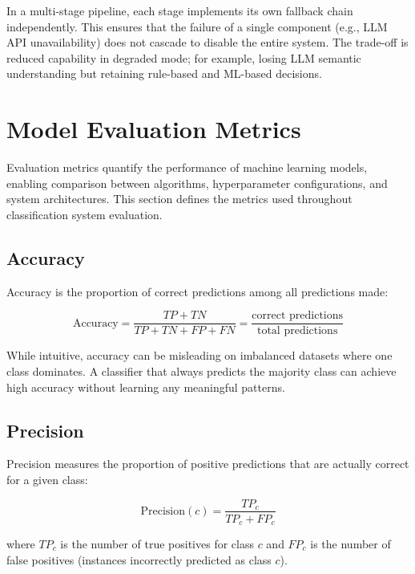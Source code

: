 \documentclass[10pt,a4paper]{article}
\begin{document}
In a multi-stage pipeline, each stage implements its own fallback chain independently. This ensures that the failure of a single component (e.g., LLM API unavailability) does not cascade to disable the entire system. The trade-off is reduced capability in degraded mode; for example, losing LLM semantic understanding but retaining rule-based and ML-based decisions.

\section{Model Evaluation Metrics}
\label{sec:evaluation-metrics}

Evaluation metrics quantify the performance of machine learning models, enabling comparison between algorithms, hyperparameter configurations, and system architectures. This section defines the metrics used throughout classification system evaluation.

\subsection{Accuracy}
\label{sec:accuracy}

Accuracy is the proportion of correct predictions among all predictions made:

\begin{equation}
\text{Accuracy} = \frac{TP + TN}{TP + TN + FP + FN} = \frac{\text{correct predictions}}{\text{total predictions}}
\label{eq:accuracy}
\end{equation}

While intuitive, accuracy can be misleading on imbalanced datasets where one class dominates. A classifier that always predicts the majority class can achieve high accuracy without learning any meaningful patterns.

\subsection{Precision}
\label{sec:precision}

Precision measures the proportion of positive predictions that are actually correct for a given class:

\begin{equation}
\text{Precision}(c) = \frac{TP_c}{TP_c + FP_c}
\label{eq:precision}
\end{equation}

where $TP_c$ is the number of true positives for class $c$ and $FP_c$ is the number of false positives (instances incorrectly predicted as class $c$).
\end{document}
